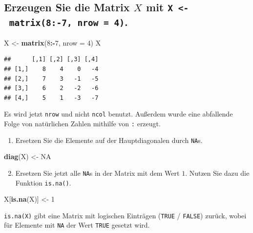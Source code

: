 \documentclass[12pt,a4paper]{article}
\newenvironment{Shaded}{\begin{snugshade}}{\end{snugshade}}
\newcommand{\AttributeTok}[1]{\textcolor[rgb]{0.13,0.29,0.53}{#1}}
\newcommand{\ConstantTok}[1]{\textcolor[rgb]{0.56,0.35,0.01}{#1}}
\newcommand{\DecValTok}[1]{\textcolor[rgb]{0.00,0.00,0.81}{#1}}
\newcommand{\FunctionTok}[1]{\textcolor[rgb]{0.13,0.29,0.53}{\textbf{#1}}}
\newcommand{\NormalTok}[1]{#1}
\newcommand{\OtherTok}[1]{\textcolor[rgb]{0.56,0.35,0.01}{#1}}
\newcommand{\SpecialCharTok}[1]{\textcolor[rgb]{0.81,0.36,0.00}{\textbf{#1}}}
\begin{document}
\vspace{0.5cm}

\subsection{\texorpdfstring{Erzeugen Sie die Matrix \(X\) mit
\texttt{X\ \textless{}-\ matrix(8:-7,\ nrow\ =\ 4)}.}{Erzeugen Sie die Matrix X mit X \textless- matrix(8:-7, nrow = 4).}}\label{erzeugen-sie-die-matrix-x-mit-x---matrix8-7-nrow-4.}

\begin{Shaded}
\begin{Highlighting}[]
\NormalTok{    X }\OtherTok{\textless{}{-}} \FunctionTok{matrix}\NormalTok{(}\DecValTok{8}\SpecialCharTok{:{-}}\DecValTok{7}\NormalTok{, }\AttributeTok{nrow =} \DecValTok{4}\NormalTok{)}
\NormalTok{    X}
\end{Highlighting}
\end{Shaded}

\begin{verbatim}
##      [,1] [,2] [,3] [,4]
## [1,]    8    4    0   -4
## [2,]    7    3   -1   -5
## [3,]    6    2   -2   -6
## [4,]    5    1   -3   -7
\end{verbatim}

Es wird jetzt \texttt{nrow} und nicht \texttt{ncol} benutzt. Außerdem
wurde eine abfallende Folge von natürlichen Zahlen mithilfe von
\texttt{:} erzeugt.

\begin{enumerate} 
  \item Ersetzen Sie die Elemente auf der Hauptdiagonalen durch \texttt{NA}s. 
\end{enumerate}

\begin{Shaded}
\begin{Highlighting}[]
    \FunctionTok{diag}\NormalTok{(X) }\OtherTok{\textless{}{-}} \ConstantTok{NA}
\end{Highlighting}
\end{Shaded}

\begin{enumerate} \setcounter{enumi}{1}
  \item Ersetzen Sie jetzt alle \texttt{NA}s in der Matrix mit dem Wert $1$. Nutzen Sie dazu die Funktion \texttt{is.na()}.
\end{enumerate}

\begin{Shaded}
\begin{Highlighting}[]
\NormalTok{    X[}\FunctionTok{is.na}\NormalTok{(X)] }\OtherTok{\textless{}{-}} \DecValTok{1}
\end{Highlighting}
\end{Shaded}

\texttt{is.na(X)} gibt eine Matrix mit logischen Einträgen
(\texttt{TRUE} / \texttt{FALSE}) zurück, wobei für Elemente mit
\texttt{NA} der Wert \texttt{TRUE} gesetzt wird.
\end{document}
